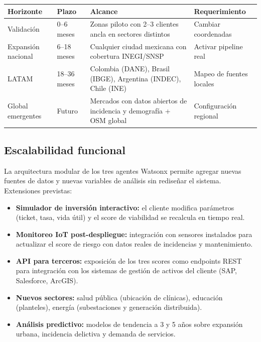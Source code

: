 \documentclass[12pt,a4paper]{article}
\begin{document}
\begin{table}[H]
\centering
\small
\renewcommand{\arraystretch}{1.3}
\begin{tabularx}{\textwidth}{l l X l}
\toprule
\rowcolor{grisoscuro}
\color{white}\textbf{Horizonte} & \color{white}\textbf{Plazo} & \color{white}\textbf{Alcance} & \color{white}\textbf{Requerimiento} \\
\midrule
Validación & 0–6 meses & Zonas piloto con 2–3 clientes ancla en sectores distintos & Cambiar coordenadas \\
\rowcolor{fondofila}
Expansión nacional & 6–18 meses & Cualquier ciudad mexicana con cobertura INEGI/SNSP & Activar pipeline real \\
LATAM & 18–36 meses & Colombia (DANE), Brasil (IBGE), Argentina (INDEC), Chile (INE) & Mapeo de fuentes locales \\
\rowcolor{fondofila}
Global emergentes & Futuro & Mercados con datos abiertos de incidencia y demografía + OSM global & Configuración regional \\
\bottomrule
\end{tabularx}
\end{table}

\subsection{Escalabilidad funcional}

La arquitectura modular de los tres agentes Watsonx permite agregar nuevas fuentes de datos y nuevas variables de análisis sin rediseñar el sistema. Extensiones previstas:

\begin{itemize}[leftmargin=1.5cm, itemsep=3pt]
  \item \textbf{Simulador de inversión interactivo:} el cliente modifica parámetros (ticket, tasa, vida útil) y el score de viabilidad se recalcula en tiempo real.
  \item \textbf{Monitoreo IoT post-despliegue:} integración con sensores instalados para actualizar el score de riesgo con datos reales de incidencias y mantenimiento.
  \item \textbf{API para terceros:} exposición de los tres scores como endpoints REST para integración con los sistemas de gestión de activos del cliente (SAP, Salesforce, ArcGIS).
  \item \textbf{Nuevos sectores:} salud pública (ubicación de clínicas), educación (planteles), energía (subestaciones y generación distribuida).
  \item \textbf{Análisis predictivo:} modelos de tendencia a 3 y 5 años sobre expansión urbana, incidencia delictiva y demanda de servicios.
\end{itemize}
\end{document}
